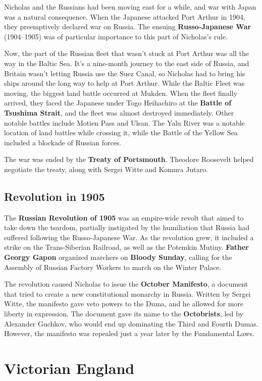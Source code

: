 Nicholas and the Russians had been moving east for a while, and war with Japan was a natural consequence.
When the Japanese attacked Port Arthur in 1904, they preemptively declared war on Russia.
The ensuing \textbf{Russo-Japanese War} (1904--1905) was of particular importance to this part of Nicholas's rule.

Now, the part of the Russian fleet that wasn't stuck at Port Arthur was all the way in the Baltic Sea.
It's a nine-month journey to the east side of Russia, and Britain wasn't letting Russia use the Suez Canal,
so Nicholas had to bring his ships around the long way to help at Port Arthur.
While the Baltic Fleet was moving, the biggest land battle occurred at Mukden.
When the fleet finally arrived, they faced the Japanese under Togo Heihachiro at the \textbf{Battle of Tsushima Strait},
and the fleet was almost destroyed immediately.
Other notable battles include Motien Pass and Ulsan.
The Yalu River was a notable location of land battles while crossing it,
while the Battle of the Yellow Sea included a blockade of Russian forces.

The war was ended by the \textbf{Treaty of Portsmouth}.
Theodore Roosevelt helped negotiate the treaty, along with Sergei Witte and Komura Jutaro.

\subsection*{Revolution in 1905}

The \textbf{Russian Revolution of 1905} was an empire-wide revolt that aimed to take down the tsardom,
partially instigated by the humiliation that Russia had suffered following the Russo-Japanese War.
As the revolution grew, it included a strike on the Trans-Siberian Railroad,
as well as the Potemkin Mutiny.
\textbf{Father Georgy Gapon} organized marchers on \textbf{Bloody Sunday},
calling for the Assembly of Russian Factory Workers to march on the Winter Palace.

The revolution caused Nicholas to issue the \textbf{October Manifesto},
a document that tried to create a new constitutional monarchy in Russia.
Written by Sergei Witte, the manifesto gave veto powers to the Duma, and he allowed for more liberty in expression.
The document gave its name to the \textbf{Octobrists}, led by Alexander Guchkov,
who would end up dominating the Third and Fourth Dumas.
However, the manifesto was repealed just a year later by the Fundamental Laws.

\section{Victorian England}

